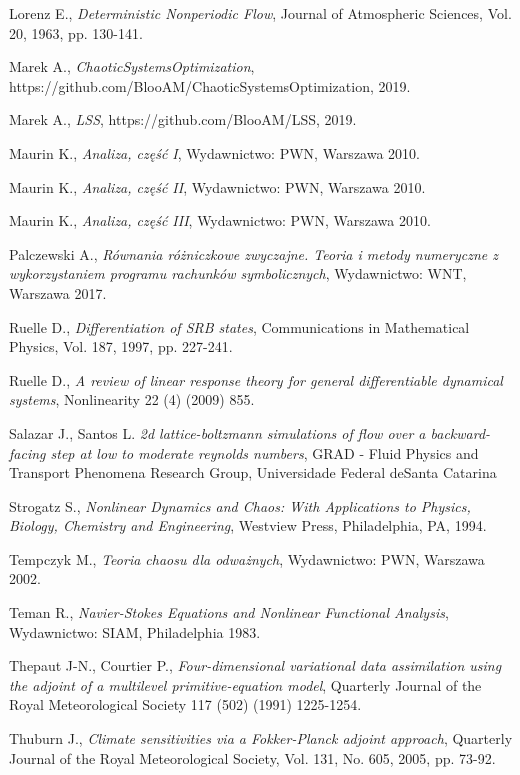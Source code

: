 \documentclass[12pt]{article}
\begin{document}
\begin{thebibliography}{99}
 Lorenz E.,
\emph{Deterministic Nonperiodic Flow},
Journal of Atmospheric Sciences, Vol. 20, 1963, pp. 130-141.

 Marek A.,
\emph{ChaoticSystemsOptimization},
https://github.com/BlooAM/ChaoticSystemsOptimization, 2019.

 Marek A.,
\emph{LSS},
https://github.com/BlooAM/LSS, 2019.

 Maurin K.,
\emph{Analiza, część I},
Wydawnictwo: PWN, Warszawa 2010.

 Maurin K.,
\emph{Analiza, część II},
Wydawnictwo: PWN, Warszawa 2010.

 Maurin K.,
\emph{Analiza, część III},
Wydawnictwo: PWN, Warszawa 2010.

 Palczewski A.,
\emph{Równania różniczkowe zwyczajne. Teoria i metody numeryczne z wykorzystaniem programu rachunków symbolicznych},
Wydawnictwo: WNT, Warszawa 2017.

 Ruelle D.,
\emph{Differentiation of SRB states},
Communications in Mathematical Physics, Vol. 187, 1997, pp. 227-241.

 Ruelle D.,
\emph{ A review of linear response theory for general differentiable dynamical systems},
Nonlinearity 22 (4) (2009) 855.

 Salazar J., Santos L.
\emph{2d lattice-boltzmann simulations of flow over a backward-facing step at low to moderate reynolds numbers},
GRAD - Fluid Physics and Transport Phenomena Research Group, Universidade Federal deSanta Catarina
	
 Strogatz S., 
\emph{Nonlinear Dynamics and Chaos: With Applications to Physics, Biology, Chemistry and Engineering},
Westview Press, Philadelphia, PA, 1994.  

 Tempczyk M., 
\emph{Teoria chaosu dla odważnych},
Wydawnictwo: PWN, Warszawa 2002.

 Teman R., 
\emph{Navier-Stokes Equations and Nonlinear Functional Analysis},
Wydawnictwo: SIAM, Philadelphia 1983.
	
 Thepaut J-N., Courtier P., 
\emph{Four-dimensional variational data assimilation using the adjoint of a multilevel primitive-equation model},
Quarterly Journal of the Royal Meteorological Society 117 (502) (1991) 1225-1254.

 Thuburn J.,
\emph{Climate sensitivities via a Fokker-Planck adjoint approach},
Quarterly Journal of the Royal Meteorological Society, Vol. 131, No. 605, 2005, pp. 73-92.


\end{thebibliography}
\end{document}
